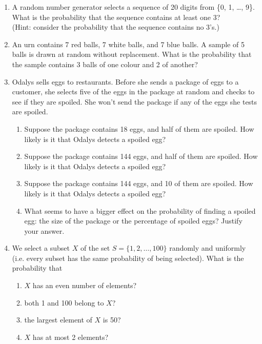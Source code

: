 \documentclass{article}
\begin{document}
\begin{enumerate}
\item A\marginpar{[2]} random number generator selects a sequence of 20 digits from \{0, 1, \ldots, 9\}. What is the probability that the sequence contains at least one 3?\\
(Hint: consider the probability that the sequence contains no 3's.)
\item An\marginpar{[3]} urn contains 7 red balls, 7 white balls, and 7 blue balls. A sample of 5 balls is drawn at random without replacement. What is the probability that the sample contains 3 balls of one colour and 2 of another?
\item Odalys\marginpar{[8]} sells eggs to restaurants. Before she sends a package of eggs to a customer, she selects five of the eggs in the package at random and checks to see if they are spoiled. She won't send the package if any of the eggs she tests are spoiled.
	\begin{enumerate}
	\item Suppose the package contains 18 eggs, and half of them are spoiled. How likely is it that Odalys detects a spoiled egg?
	\item Suppose the package contains 144 eggs, and half of them are spoiled. How likely is it that Odalys detects a spoiled egg?
	\item Suppose the package contains 144 eggs, and 10 of them are spoiled. How likely is it that Odalys detects a spoiled egg?
	\item What seems to have a bigger effect on the probability of finding a spoiled egg: the size of the package or the percentage of spoiled eggs? Justify your answer.
	\end{enumerate}
\item We\marginpar{[8]} select a subset $X$ of the set $S=\{1,2,\ldots,100\}$ randomly and uniformly (i.e. every subset has the same probability of being selected). What is the probability that
	\begin{enumerate}
	\item $X$ has an even number of elements?
	\item both 1 and 100 belong to $X$?
	\item the largest element of $X$ is 50?
	\item $X$ has at most 2 elements?
	\end{enumerate}
\end{enumerate}
\hrulefill\\
\label{end}
\end{document}

